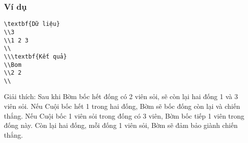 \subsubsection{   Ví dụ  }
\begin{verbatim}
\textbf{Dữ liệu}
\\3
\\1 2 3 
\\
\\\textbf{Kết quả}
\\Bom
\\2 2
\\\end{verbatim}

   Giải thích: Sau khi Bờm bốc hết đống có 2 viên sỏi, sẽ còn lại hai đống 1 và 3 viên sỏi. Nếu Cuội bốc hết 1 trong hai đống, Bờm sẽ bốc đống còn lại và chiến thắng. Nếu Cuội bốc 1 viên sỏi trong đống có 3 viên, Bờm bốc tiếp 1 viên trong đống này. Còn lại hai đống, mỗi đống 1 viên sỏi, Bờm sẽ đảm bảo giành chiến thắng.  

